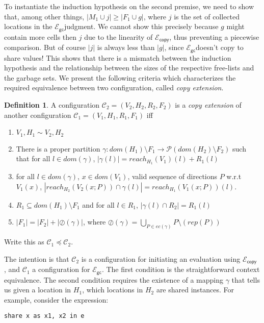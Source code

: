 \documentclass{easychair}
\newcommand{\ms}[1]{\ensuremath{\mathsf{#1}}}
\newcommand{\oh}[1]{\oslash(#1)}
\newcommand{\gcSem}{\ensuremath{\mathcal{E}_{\ms{gc}}}}
\newcommand{\copySem}{\ensuremath{\mathcal{E}_{\ms{copy}}}}
\theoremstyle{definition}
\newtheorem{definition}{Definition}
\begin{document}
To instantiate the induction hypothesis on the second premise, we need to show that, among 
other things, $|M_1 \cup j| \ge |F_1 \cup g|$, where $j$ is the set of collected locations in 
the \gcSem judgment. We cannot show this precisely because $g$ might contain more cells 
then $j$ due to the linearity of \copySem, thus preventing a piecewise comparison. 
But of course $|j|$ is always less than $|g|$, since \gcSem doesn't copy to share 
values! This shows that there is a mismatch between the induction hypothesis and the relationship
between the sizes of the respective free-lists and the garbage sets. We present the following 
criteria which characterizes the required equivalence between two configuration,
called \emph{copy extension}.

\begin{definition}
A configuration $\mathcal{C}_2 = (V_2,H_2,R_2,F_2)$ is a \emph{copy extension} of another configuration
$\mathcal{C}_1 = (V_1,H_1,R_1,F_1)$ iff
\begin{enumerate}
\item $V_1,H_1 \sim V_2,H_2$
\item There is a proper partition $\gamma : dom(H_1) \setminus F_1 \to \mathcal{P}(dom(H_2) \setminus F_2)$ 
such that for all $l \in dom(\gamma)$, $|\gamma(l)| = reach_{H_1}(V_1)(l) + R_1(l)$
\item for all $l \in dom(\gamma)$, $x \in dom(V_1)$, valid sequence of directions $P$ w.r.t $V_1(x)$,
	$|reach_{H_2}(V_2(x;P)) \cap \gamma(l)| = reach_{H_1}(V_1(x;P))(l)$.
\item $R_1 \subseteq dom(H_1) \setminus F_1$ and 
	for all $l \in R_1$, $|\gamma(l) \cap R_2| = R_1(l)$
\item $|F_1| = |F_2| + |\oh{\gamma}|$, where 
	$\oh{\gamma} = \bigcup_{P \in ec(\gamma)} P \setminus (rep(P))$
\end{enumerate}
Write this as $\mathcal{C}_1 \preceq \mathcal{C}_2$.
\end{definition} 
The intention is that $\mathcal{C}_2$ is a configuration for initiating an evaluation using \copySem
, and $\mathcal{C}_1$ a configuration for \gcSem. 
The first condition is the straightforward context equivalence.
The second condition requires the existence of 
a mapping $\gamma$ that tells us given a location in $H_1$, which locations in $H_2$ 
are shared instances. For example, consider the expression: 

\begin{verbatim}
share x as x1, x2 in e
\end{verbatim}
\end{document}
